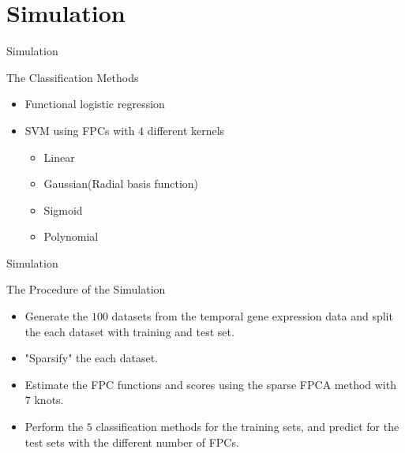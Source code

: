 \documentclass{beamer}
\begin{document}
\section{Simulation}
\begin{frame}{Simulation}
	\begin{block}{The Classification Methods}
		\vspace{0.1cm}
		\begin{itemize}
			\item {
				Functional logistic regression
			}
			\item {
				 SVM using FPCs with $4$ different kernels
			}
			\begin{itemize}
				\item {
					Linear
				}
				\item {
					Gaussian(Radial basis function)
				}
				\item {
					Sigmoid
				}
				\item {
					Polynomial
				}
			\end{itemize}
		\end{itemize}
	\end{block}
\end{frame}

\begin{frame}{Simulation}
	\begin{block}{The Procedure of the Simulation}
		\vspace{0.1cm}
		\begin{itemize}
			\item {
				Generate the $100$ datasets from the temporal gene expression data and 
				split the each dataset with training and test set.
			}
			\item {
				"Sparsify" the each dataset.
			}		
			\item {
				Estimate the FPC functions and scores using the sparse FPCA method with $7$ knots.
			}
			\item {
				Perform the $5$ classification methods for the training sets, and predict for the test sets with the different number of FPCs.
			}
		\end{itemize}
	\end{block}
\end{frame}
\end{document}
